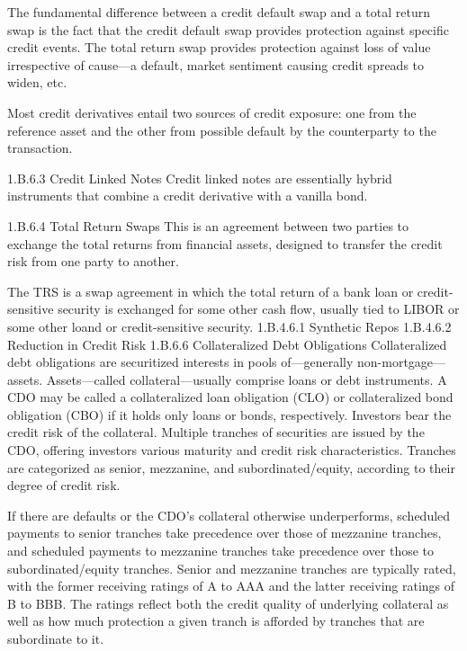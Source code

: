 The fundamental difference between a credit default swap and a total return swap is the fact that the credit default swap provides protection against specific credit events. The total return swap provides protection against loss of value irrespective of cause—a default, market sentiment causing credit spreads to widen, etc.

Most credit derivatives entail two sources of credit exposure: one from the reference asset and the other from possible default by the counterparty to the transaction.



 
1.B.6.3 Credit Linked Notes
Credit linked notes are essentially hybrid instruments that combine a credit derivative with a vanilla bond.
 
 
1.B.6.4 Total Return Swaps
This is an agreement between two parties to exchange the total returns from financial assets, designed to transfer the credit risk from one party to another.
 
The TRS is a swap agreement in which the total return of a bank loan or credit-sensitive security is exchanged for some other cash flow, usually tied to LIBOR or some other loand or credit-sensitive security.
1.B.4.6.1 Synthetic Repos
1.B.4.6.2 Reduction in Credit Risk
1.B.6.6 Collateralized Debt Obligations
Collateralized debt obligations are securitized interests in pools of—generally non-mortgage—assets. Assets—called collateral—usually comprise loans or debt instruments. A CDO may be called a collateralized loan obligation (CLO) or collateralized bond obligation (CBO) if it holds only loans or bonds, respectively. Investors bear the credit risk of the collateral. Multiple tranches of securities are issued by the CDO, offering investors various maturity and credit risk characteristics. Tranches are categorized as senior, mezzanine, and subordinated/equity, according to their degree of credit risk. 
 
If there are defaults or the CDO's collateral otherwise underperforms, scheduled payments to senior tranches take precedence over those of mezzanine tranches, and scheduled payments to mezzanine tranches take precedence over those to subordinated/equity tranches. Senior and mezzanine tranches are typically rated, with the former receiving ratings of A to AAA and the latter receiving ratings of B to BBB. The ratings reflect both the credit quality of underlying collateral as well as how much protection a given tranch is afforded by tranches that are subordinate to it.
 
